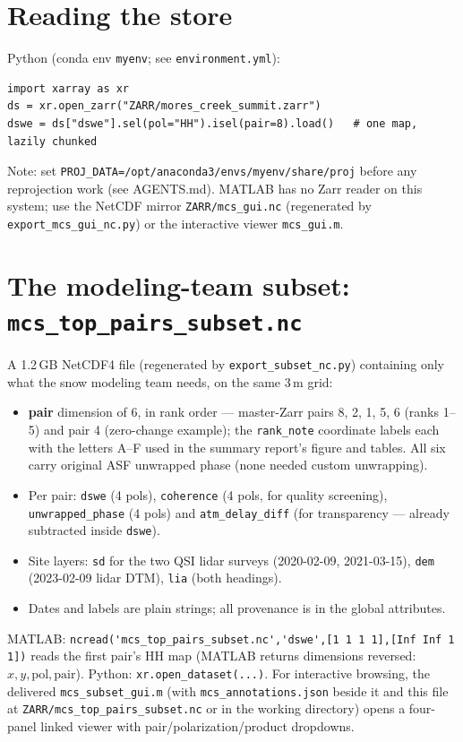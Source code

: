 \documentclass[11pt]{article}
\begin{document}
\section{Reading the store}

Python (conda env \texttt{myenv}; see \texttt{environment.yml}):
\begin{verbatim}
import xarray as xr
ds = xr.open_zarr("ZARR/mores_creek_summit.zarr")
dswe = ds["dswe"].sel(pol="HH").isel(pair=8).load()   # one map, lazily chunked
\end{verbatim}
Note: set \texttt{PROJ\_DATA=/opt/anaconda3/envs/myenv/share/proj} before any
reprojection work (see AGENTS.md). MATLAB has no Zarr reader on this system; use the
NetCDF mirror \texttt{ZARR/mcs\_gui.nc} (regenerated by \texttt{export\_mcs\_gui\_nc.py})
or the interactive viewer \texttt{mcs\_gui.m}.

\section{The modeling-team subset: \texttt{mcs\_top\_pairs\_subset.nc}}

A 1.2\,GB NetCDF4 file (regenerated by \texttt{export\_subset\_nc.py}) containing only
what the snow modeling team needs, on the same 3\,m grid:

\begin{itemize}
\item \textbf{pair} dimension of 6, in rank order --- master-Zarr pairs 8, 2, 1, 5, 6
      (ranks 1--5) and pair 4 (zero-change example); the \texttt{rank\_note} coordinate
      labels each with the letters A--F used in the summary report's figure and tables. All six carry original ASF unwrapped phase (none needed custom
      unwrapping).
\item Per pair: \texttt{dswe} (4 pols), \texttt{coherence} (4 pols, for quality
      screening), \texttt{unwrapped\_phase} (4 pols) and \texttt{atm\_delay\_diff}
      (for transparency --- already subtracted inside \texttt{dswe}).
\item Site layers: \texttt{sd} for the two QSI lidar surveys (2020-02-09, 2021-03-15),
      \texttt{dem} (2023-02-09 lidar DTM), \texttt{lia} (both headings).
\item Dates and labels are plain strings; all provenance is in the global attributes.
\end{itemize}

MATLAB: \verb|ncread('mcs_top_pairs_subset.nc','dswe',[1 1 1 1],[Inf Inf 1 1])| reads the
first pair's HH map (MATLAB returns dimensions reversed: $x, y, \mathrm{pol},
\mathrm{pair}$). Python: \verb|xr.open_dataset(...)|. For interactive browsing, the
delivered \texttt{mcs\_subset\_gui.m} (with \texttt{mcs\_annotations.json} beside it
and this file at \texttt{ZARR/mcs\_top\_pairs\_subset.nc} or in the working directory)
opens a four-panel linked viewer with pair/polarization/product dropdowns.
\end{document}
